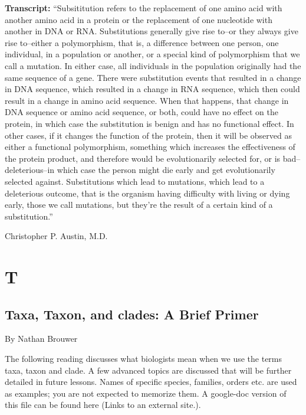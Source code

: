 \documentclass[
]{book}
\begin{document}
\textbf{Transcript:} ``Subsititution refers to the replacement of one amino acid with another amino acid in a protein or the replacement of one nucleotide with another in DNA or RNA. Substitutions generally give rise to--or they always give rise to--either a polymorphism, that is, a difference between one person, one individual, in a population or another, or a special kind of polymorphism that we call a mutation. In either case, all individuals in the population originally had the same sequence of a gene. There were substitution events that resulted in a change in DNA sequence, which resulted in a change in RNA sequence, which then could result in a change in amino acid sequence. When that happens, that change in DNA sequence or amino acid sequence, or both, could have no effect on the protein, in which case the substitution is benign and has no functional effect. In other cases, if it changes the function of the protein, then it will be observed as either a functional polymorphism, something which increases the effectiveness of the protein product, and therefore would be evolutionarily selected for, or is bad--deleterious--in which case the person might die early and get evolutionarily selected against. Substitutions which lead to mutations, which lead to a deleterious outcome, that is the organism having difficulty with living or dying early, those we call mutations, but they're the result of a certain kind of a substitution.''

Christopher P. Austin, M.D.

\hypertarget{t}{%
\chapter{T}\label{t}}

\hypertarget{taxa-taxon-and-clades-a-brief-primer}{%
\section{Taxa, Taxon, and clades: A Brief Primer}\label{taxa-taxon-and-clades-a-brief-primer}}

By Nathan Brouwer

The following reading discusses what biologists mean when we use the terms taxa, taxon and clade. A few advanced topics are discussed that will be further detailed in future lessons. Names of specific species, families, orders etc. are used as examples; you are not expected to memorize them. A google-doc version of this file can be found here (Links to an external site.).
\end{document}
